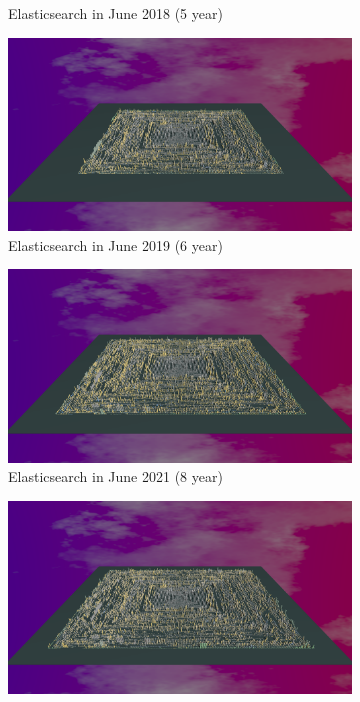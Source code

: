 \begin{figure}[ht]
\begin{subfigure}{0.48\textwidth}
        \caption{Elasticsearch in June 2018 (5 year)} 
        \label{fig:Elastic_V5_S3}
    \end{subfigure}\hspace*{\fill}
    \begin{subfigure}{0.48\textwidth}
        \includegraphics[width=\linewidth]{Elasticsearch/Animation006.png}
        \caption{Elasticsearch in June 2019  (6 year)} 
        \label{fig:Elastic_V5_S4}
    \end{subfigure}
    \medskip
    \begin{subfigure}{0.48\textwidth}
        \includegraphics[width=\linewidth]{Elasticsearch/Animation008.png}
        \caption{Elasticsearch in June 2021 (8 year)} 
        \label{fig:Elastic_V5_S5}
    \end{subfigure}\hspace*{\fill}
    \begin{subfigure}{0.48\textwidth}
        \includegraphics[width=\linewidth]{Elasticsearch/Animation009.png}

\end{subfigure}
\end{figure}
